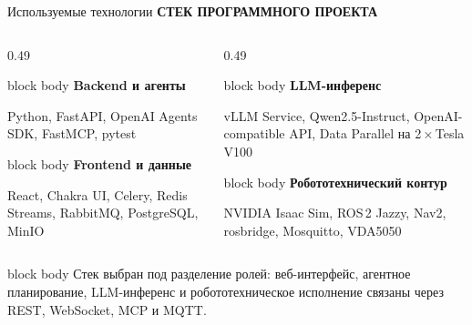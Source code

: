 \documentclass[aspectratio=169,11pt]{beamer}
\newcommand{\keybox}[2]{%
  \begin{beamercolorbox}[wd=\linewidth,sep=0.14cm]{block body}
    {\color{hseblue}\bfseries #1}\par
    \vspace{0.04cm}
    {\small #2}
  \end{beamercolorbox}
}
\newcommand{\sectiontag}[1]{%
  {\scriptsize\bfseries\color{hsegray}\MakeUppercase{#1}}\par\vspace{0.06cm}
}
\begin{document}
\begin{frame}{Используемые технологии}
  \sectiontag{Стек программного проекта}
  \begin{columns}[T,onlytextwidth]
    \begin{column}{0.49\textwidth}
      \begin{minipage}[t][1.90cm][t]{\linewidth}
        \keybox{Backend и агенты}{Python, FastAPI, OpenAI Agents SDK, FastMCP, pytest}
      \end{minipage}
      \vspace{0.10cm}
      \keybox{Frontend и данные}{React, Chakra UI, Celery, Redis Streams, RabbitMQ, PostgreSQL, MinIO}
    \end{column}
    \begin{column}{0.49\textwidth}
      \begin{minipage}[t][1.90cm][t]{\linewidth}
        \keybox{LLM-инференс}{vLLM Service, Qwen2.5-Instruct, OpenAI-compatible API, Data Parallel на 2\,×\,Tesla V100}
      \end{minipage}
      \vspace{0.10cm}
      \keybox{Робототехнический контур}{NVIDIA Isaac Sim, ROS\,2 Jazzy, Nav2, rosbridge, Mosquitto, VDA5050}
    \end{column}
  \end{columns}
  \vspace{0.20cm}
  \begin{beamercolorbox}[wd=\linewidth,sep=0.13cm]{block body}
    \small Стек выбран под разделение ролей: веб-интерфейс, агентное планирование,
    LLM-инференс и робототехническое исполнение связаны через REST, WebSocket, MCP и MQTT.
  \end{beamercolorbox}
\end{frame}
\end{document}
